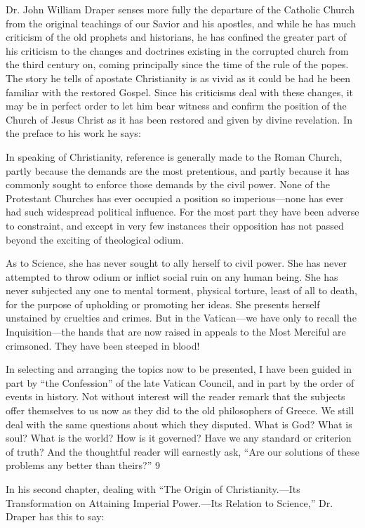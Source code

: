 Dr. John William Draper senses more fully the departure of the Catholic Church from the
original teachings of our Savior and his apostles, and while he has much criticism of the old
prophets and historians, he has confined the greater part of his criticism to the changes and
doctrines existing in the corrupted church from the third century on, coming principally since
the time of the rule of the popes. The story he tells of apostate Christianity is as vivid as it
could be had he been familiar with the restored Gospel. Since his criticisms deal with these
changes, it may be in perfect order to let him bear witness and confirm the position of the
Church of Jesus Christ as it has been restored and given by divine revelation. In the preface
to his work he says:

In speaking of Christianity, reference is generally made to the Roman Church, partly because
the demands are the most pretentious, and partly because it has commonly sought to enforce
those demands by the civil power. None of the Protestant Churches has ever occupied a
position so imperious—none has ever had such widespread political influence. For the most
part they have been adverse to constraint, and except in very few instances their opposition
has not passed beyond the exciting of theological odium.

As to Science, she has never sought to ally herself to civil power. She has never attempted to
throw odium or inflict social ruin on any human being. She has never subjected any one to
mental torment, physical torture, least of all to death, for the purpose of upholding or
promoting her ideas. She presents herself unstained by cruelties and crimes. But in the
Vatican—we have only to recall the Inquisition—the hands that are now raised in appeals to
the Most Merciful are crimsoned. They have been steeped in blood!

In selecting and arranging the topics now to be presented, I have been guided in part by ``the
Confession'' of the late Vatican Council, and in part by the order of events in history. Not
without interest will the reader remark that the subjects offer themselves to us now as they
did to the old philosophers of Greece. We still deal with the same questions about which they
disputed. What is God? What is soul? What is the world? How is it governed? Have we any
standard or criterion of truth? And the thoughtful reader will earnestly ask, ``Are our solutions
of these problems any better than theirs?'' 9

In his second chapter, dealing with ``The Origin of Christianity.—Its Transformation on
Attaining Imperial Power.—Its Relation to Science,'' Dr. Draper has this to say:

